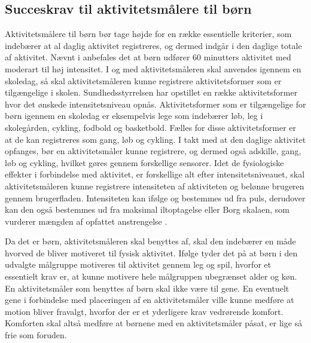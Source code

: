 \subsection{Succeskrav til aktivitetsmålere til børn} \label{succeskrav}

Aktivitetsmålere til børn bør tage højde for en række essentielle kriterier, som indebærer at al daglig aktivitet registreres, og dermed indgår i den daglige totale af aktivitet. 
Nævnt i  anbefales det at børn udfører 60 minutters aktivitet med moderart til høj intensitet. I og med aktivitetsmåleren skal anvendes igennem en skoledag, så skal aktivitetsmåleren kunne registrere aktivitetsformer som er tilgængelige i skolen. Sundhedsstyrrelsen har opstillet en række aktivitetsformer hvor det ønskede intensitetsniveau opnås. Aktivitetsformer som er tilgængelige for børn igennem en skoledag er eksempelvis lege som indebærer løb, leg i skolegården, cykling, fodbold og basketbold. Fælles for disse aktivitetsformer er at de kan registreres som gang, løb og cykling. \citep{Sundhedsstyrrelsen2003}
I takt med at den daglige aktivitet opfanges, bør en aktivitetsmåler kunne registrere, og dermed også adskille, gang, løb og cykling, hvilket gøres gennem forskellige sensorer. 
Idet de fysiologiske effekter i forbindelse med aktivitet, er forskellige alt efter intensitetsniveauet, skal aktivitetsmåleren kunne registrere intensiteten af aktiviteten og belønne brugeren gennem brugerfladen. Intensiteten kan ifølge  og  bestemmes ud fra puls, derudover kan den også bestemmes ud fra maksimal iltoptagelse eller Borg skalaen, som vurderer mængden af opfattet anstrengelse \citep{Kiens2007}. 

Da det er børn, aktivitetsmåleren skal benyttes af, skal den indebærer en måde hvorved de bliver motiveret til fysisk aktivitet. Ifølge  tyder det på at børn i den udvalgte målgruppe motiveres til aktivitet gennem leg og spil, hvorfor et essentielt krav er, at kunne motivere hele målgruppen ubegrænset alder og køn. \newline
En aktivitetsmåler som benyttes af børn skal ikke være til gene. En eventuelt gene i forbindelse med placeringen af en aktivitetsmåler ville kunne medføre at motion bliver fravalgt, hvorfor der er et yderligere krav vedrørende komfort. Komforten skal altså medføre at børnene med en aktivitetsmåler påsat, er lige så frie som foruden.

